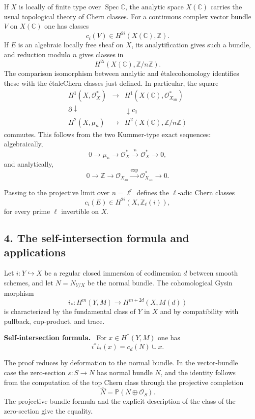 \documentclass[14pt]{extarticle}
\newcommand{\ZZ}{\mathbb Z}
\newcommand{\CC}{\mathbb C}
\newcommand{\Spec}{\operatorname{Spec}}
\newcommand{\cO}{\mathcal O}
\providecommand{\etale}{\'{e}tale}
\newenvironment{statement}[1]{\par\medskip\noindent\textbf{#1.}\ }{\par\medskip}
\begin{document}
If $X$ is locally of finite type over $\Spec\CC$, the analytic space $X(\CC)$ carries the usual topological theory of Chern classes. For a continuous complex vector bundle $V$ on $X(\CC)$ one has classes
\[
   c_i(V)\in H^{2i}(X(\CC),\ZZ).
\]
If $E$ is an algebraic locally free sheaf on $X$, its analytification gives such a bundle, and reduction modulo $n$ gives classes in
\[
   H^{2i}(X(\CC),\ZZ/n\ZZ).
\]
The comparison isomorphism between analytic and \etale cohomology identifies these with the \etale Chern classes just defined. In particular, the square
\[
\begin{array}{ccc}
H^1(X,\cO_X^*) & \longrightarrow & H^1(X(\CC),\cO_{X_{\mathrm{an}}}^*) \\
\partial\downarrow && \downarrow c_1 \\
H^2(X,\mu_n) & \longrightarrow & H^2(X(\CC),\ZZ/n\ZZ)
\end{array}
\]
commutes. This follows from the two Kummer-type exact sequences: algebraically,
\[
   0\to\mu_n\to\cO_X^*\xrightarrow{n}\cO_X^*\to0,
\]
and analytically,
\[
   0\to\ZZ\to\cO_{X_{\mathrm{an}}}\xrightarrow{\exp}\cO_{X_{\mathrm{an}}}^*\to0.
\]

Passing to the projective limit over $n=\ell^r$ defines the $\ell$-adic Chern classes
\[
   c_i(E)\in H^{2i}(X,\ZZ_\ell(i)),
\]
for every prime $\ell$ invertible on $X$.

\subsection*{4. The self-intersection formula and applications}

Let $i:Y\hookrightarrow X$ be a regular closed immersion of codimension $d$ between smooth schemes, and let $N=N_{Y/X}$ be the normal bundle. The cohomological Gysin morphism
\[
   i_*:H^m(Y,M)\to H^{m+2d}(X,M(d))
\]
is characterized by the fundamental class of $Y$ in $X$ and by compatibility with pullback, cup-product, and trace.

\begin{statement}{Self-intersection formula}
For $x\in H^*(Y,M)$ one has
\[
   i^*i_*(x)=c_d(N)\cup x.
\]
\end{statement}

The proof reduces by deformation to the normal bundle. In the vector-bundle case the zero-section $s:S\to N$ has normal bundle $N$, and the identity follows from the computation of the top Chern class through the projective completion
\[
   \widehat N=\mathbb P(N\oplus\cO_S).
\]
The projective bundle formula and the explicit description of the class of the zero-section give the equality.
\end{document}
